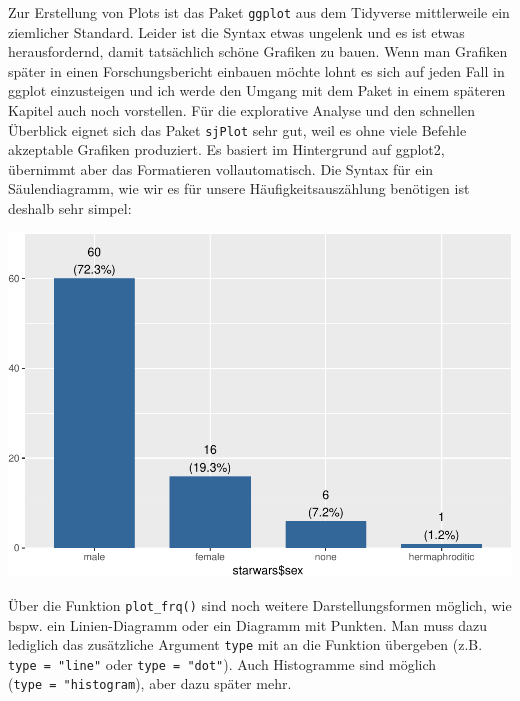 \documentclass[
]{book}
\newenvironment{Shaded}{\begin{snugshade}}{\end{snugshade}}
\newcommand{\FunctionTok}[1]{\textcolor[rgb]{0.00,0.00,0.00}{#1}}
\newcommand{\NormalTok}[1]{#1}
\newcommand{\SpecialCharTok}[1]{\textcolor[rgb]{0.00,0.00,0.00}{#1}}
\begin{document}
Zur Erstellung von Plots ist das Paket \texttt{ggplot} aus dem Tidyverse mittlerweile ein ziemlicher Standard. Leider ist die Syntax etwas ungelenk und es ist etwas herausfordernd, damit tatsächlich schöne Grafiken zu bauen. Wenn man Grafiken später in einen Forschungsbericht einbauen möchte lohnt es sich auf jeden Fall in ggplot einzusteigen und ich werde den Umgang mit dem Paket in einem späteren Kapitel auch noch vorstellen. Für die explorative Analyse und den schnellen Überblick eignet sich das Paket \texttt{sjPlot} sehr gut, weil es ohne viele Befehle akzeptable Grafiken produziert. Es basiert im Hintergrund auf ggplot2, übernimmt aber das Formatieren vollautomatisch. Die Syntax für ein Säulendiagramm, wie wir es für unsere Häufigkeitsauszählung benötigen ist deshalb sehr simpel:

\begin{Shaded}
\end{Shaded}

\includegraphics{r_book_files/figure-latex/freq_plot-1.pdf}

Über die Funktion \texttt{plot\_frq()} sind noch weitere Darstellungsformen möglich, wie bspw. ein Linien-Diagramm oder ein Diagramm mit Punkten. Man muss dazu lediglich das zusätzliche Argument \texttt{type} mit an die Funktion übergeben (z.B. \texttt{type\ =\ "line"} oder \texttt{type\ =\ "dot"}). Auch Histogramme sind möglich (\texttt{type\ =\ "histogram}), aber dazu später mehr.
\end{document}
